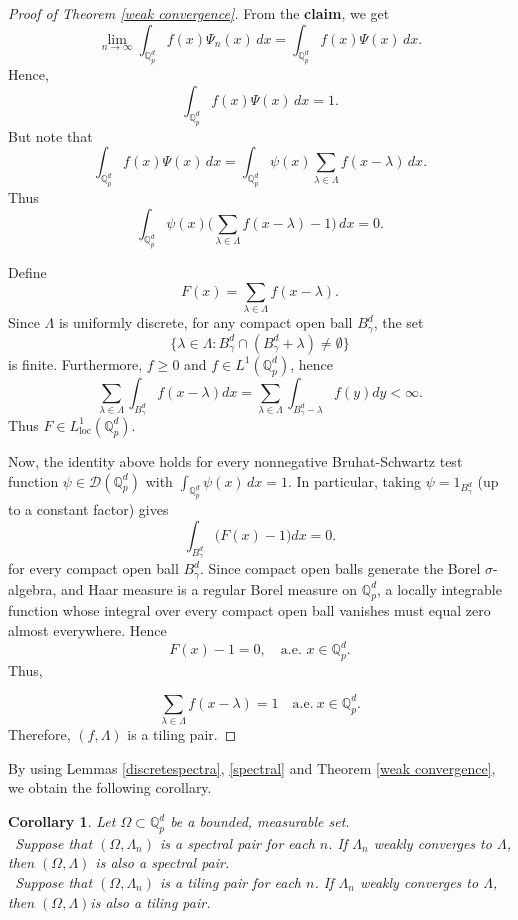 \documentclass[a4paper,12pt]{amsart}
\newtheorem{corollary}[theorem]{Corollary}
\def\Q{\mathbb{Q}}
\def\Qp{\mathbb{Q}_p}
\begin{document}
\begin{proof}[Proof of Theorem \ref{weak convergence}]
From the {\bf claim}, we get
\[
\lim_{n \to \infty} \int_{\Qp^d} f(x) \Psi_n(x) \, dx = \int_{\Qp^d} f(x) \Psi(x) \, dx.
\]
Hence,
\[
\int_{\Qp^d} f(x) \Psi(x) \, dx = 1.
\]
But note that
\[
\int_{\Qp^d} f(x) \Psi(x) \, dx =
\int_{\Qp^d} \psi(x) \sum_{\lambda \in \Lambda} f(x - \lambda) \, dx.
\]
Thus
\[
\int_{\Qp^d} \psi(x) \Big(\sum_{\lambda \in \Lambda}f(x - \lambda)-1\Big) \, dx = 0.
\]

Define
\[
F(x)=\sum_{\lambda\in\Lambda}f(x-\lambda).
\]
Since $\Lambda$ is uniformly discrete, for any compact open ball $B_\gamma^d$,
the set $$\Big\{\lambda\in\Lambda: B_\gamma^d\cap (B_\gamma^d+\lambda)\neq\emptyset\Big\}$$ is finite.
Furthermore, $f\geq0$ and $f\in L^1(\Qp^d)$,
hence
\[
\sum_{\lambda\in\Lambda}\int_{B_\gamma^d} f(x-\lambda)dx = \sum_{\lambda\in\Lambda}\int_{B_\gamma^d-\lambda}f(y)dy < \infty.
\]
Thus $F\in L^1_{\text{loc}}(\Qp^d)$.

Now, the identity above holds for every nonnegative Bruhat-Schwartz test function
$\psi\in\mathcal{D}(\Qp^d)$ with  $\int_{\Qp^d}\psi(x)\,dx=1$.
In particular, taking $\psi=1_{B_\gamma^d}$ (up to a constant factor) gives
\[
\int_{B_\gamma^d} \big(F(x)-1\big)dx = 0.
\]
for every compact open ball $B_\gamma^d$.
Since compact open balls generate the Borel $\sigma$-algebra, and Haar measure is a regular
Borel measure on $\Qp^d$, a locally integrable function whose integral over every compact open ball
vanishes must equal zero almost everywhere. Hence
\[
F(x)-1=0,\quad \text{a.e. }x\in\Qp^d.
\]
Thus,

\[
\sum_{\lambda \in \Lambda} f(x - \lambda) = 1 \quad \text{a.e.}\  x\in \Qp^d.
\]
Therefore, $(f, \Lambda)$ is a tiling pair.
\end{proof}

By using Lemmas \ref{discretespectra}, \ref{spectral} and Theorem \ref{weak convergence}, we obtain the following corollary.

\begin{corollary}\label{coro-weak limit}
Let $\Omega\subset\Q_p^d$ be a bounded, measurable set.\\
 \ Suppose that $(\Omega, \Lambda_n)$ is a spectral pair for each $n$.
If $\Lambda_n$ weakly converges to $\Lambda$, then $(\Omega, \Lambda)$ is also a spectral pair.\\
 \ Suppose that $(\Omega, \Lambda_n)$ is a tiling pair for each $n$. If $\Lambda_n$ weakly converges
to $\Lambda$, then $(\Omega, \Lambda)$is also a tiling pair.
\end{corollary}
\end{document}
